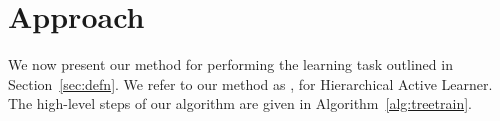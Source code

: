 \documentclass[10pt, conference, compsocconf]{IEEEtran}
\newcommand{\sys}{\Call{Hal}{}} %
\begin{document}
% 
% 

\section{Approach}
\label{sec:approach}

We now present our method for performing the learning task outlined in 
Section~\ref{sec:defn}. 
We refer to our method as \sys, for Hierarchical Active Learner.
The high-level steps
of our algorithm are given in Algorithm~\ref{alg:treetrain}.  
\end{document}

